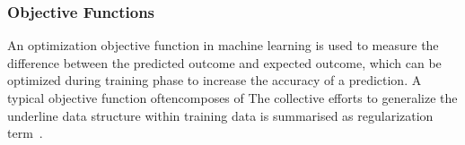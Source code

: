 \subsubsection{Objective Functions}
An optimization objective function in machine learning is used to measure the difference between the predicted outcome and expected outcome, which can be optimized during training phase to increase the accuracy of a prediction. A typical objective function oftencomposes of The collective efforts to generalize the underline data structure within training data is summarised as regularization term~\cite{goodfellow_2015}.  